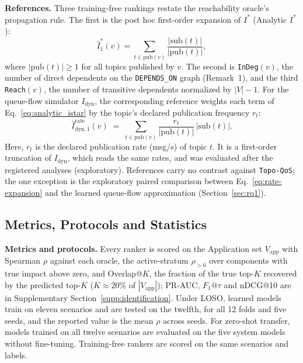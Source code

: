 \documentclass[preprint,3p]{elsarticle}
\begin{document}
\noindent\textbf{References.} Three training-free rankings restate the reachability oracle's propagation rule. The first is the post hoc first-order expansion of $I^*$ (Analytic $I^*$):
\begin{equation}
\label{eq:analytic_istar}
\hat{I}^*_1(v) = \sum_{t \in \text{pub}(v)} \frac{|\text{sub}(t)|}{|\text{pub}(t)|},
\end{equation}
where $|\text{pub}(t)| \ge 1$ for all topics published by $v$. The second is \texttt{InDeg}$(v)$, the number of direct dependents on the \texttt{DEPENDS\_ON} graph (Remark~1), and the third \texttt{Reach}$(v)$, the number of transitive dependents normalized by $|V| - 1$. For the queue-flow simulator $I_{\text{dyn}}$, the corresponding reference weights each term of Eq.~\eqref{eq:analytic_istar} by the topic's declared publication frequency $r_t$:
\begin{equation}
\hat{I}^{\mathrm{rate}}_{\mathrm{dyn},1}(v) \;=\; \sum_{t \in \mathrm{pub}(v)} \frac{r_t}{|\mathrm{pub}(t)|}\,\lvert \mathrm{sub}(t) \rvert.
\label{eq:rate-expansion}
\end{equation}
Here, $r_t$ is the declared publication rate (msg/s) of topic $t$. It is a first-order truncation of $I_{\text{dyn}}$, which reads the same rates, and was evaluated after the registered analyses (exploratory). References carry no contrast against \texttt{Topo-QoS}; the one exception is the exploratory paired comparison between Eq.~\eqref{eq:rate-expansion} and the learned queue-flow approximation (Section~\ref{sec:rq1}).

\subsection{Metrics, Protocols and Statistics}
\label{sec:6.3}

\noindent\textbf{Metrics and protocols.} Every ranker is scored on the Application set $V_{\text{app}}$ with Spearman $\rho$ against each oracle, the active-stratum $\rho_{>0}$ over components with true impact above zero, and Overlap@$K$, the fraction of the true top-$K$ recovered by the predicted top-$K$ ($K \approx 20\%$ of $|V_{\text{app}}|$); PR-AUC, $F_1@\tau$ and nDCG@10 are in Supplementary Section~\ref{supp:identification}. Under LOSO, learned models train on eleven scenarios and are tested on the twelfth, for all 12 folds and five seeds, and the reported value is the mean $\rho$ across seeds. For zero-shot transfer, models trained on all twelve scenarios are evaluated on the five system models without fine-tuning. Training-free rankers are scored on the same scenarios and labels.
\end{document}

